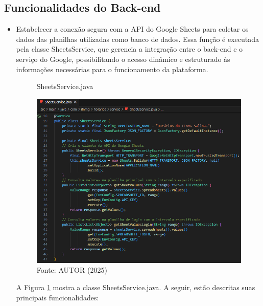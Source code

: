 \subsection{Funcionalidades do Back-end}

\begin{itemize}
    \item Estabelecer a conexão segura com a API do Google Sheets para coletar os dados das planilhas utilizadas como banco de dados. Essa função é executada pela classe SheetsService, que gerencia a integração entre o back-end e o serviço do Google, possibilitando o acesso dinâmico e estruturado às informações necessárias para o funcionamento da plataforma.
    
    \begin{figure}[H]
        \centering
        \caption{SheetsService.java}
        \includegraphics[width=1\textwidth]{Figuras/back-2.png}
        \caption*{Fonte: AUTOR (2025)}
        \label{fig_back_2}
    \end{figure}
    
    A Figura \ref{fig_back_2} mostra a classe SheetsService.java. A seguir, estão descritas suas principais funcionalidades:


\end{itemize}
